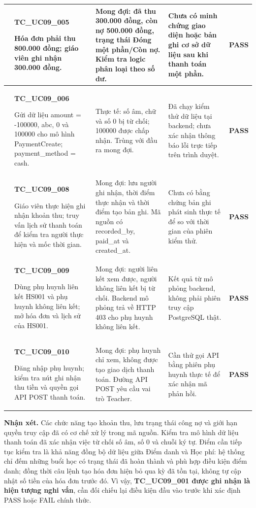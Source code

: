 \begin{longtable}{|>{\centering\arraybackslash}p{0.8cm}|>{\raggedright\arraybackslash}p{4.6cm}|>{\raggedright\arraybackslash}p{3.8cm}|>{\raggedright\arraybackslash}p{3.8cm}|>{\centering\arraybackslash}p{1.5cm}|}
5 & \textbf{TC\_UC09\_005}\par Hóa đơn phải thu 800.000 đồng; giáo viên ghi nhận 300.000 đồng. & Mong đợi: đã thu 300.000 đồng, còn nợ 500.000 đồng, trạng thái Đóng một phần/Còn nợ. Kiểm tra logic phân loại theo số dư. & Chưa có minh chứng giao diện hoặc bản ghi cơ sở dữ liệu sau khi thanh toán một phần. & \textbf{PASS} \\ \hline
6 & \textbf{TC\_UC09\_006}\par Gửi dữ liệu amount = -100000, abc, 0 và 100000 cho mô hình PaymentCreate; payment\_method = cash. & Thực tế: số âm, chữ và số 0 bị từ chối; 100000 được chấp nhận. Trùng với đầu ra mong đợi. & Đã chạy kiểm thử dữ liệu tại backend; chưa xác nhận thông báo lỗi trực tiếp trên trình duyệt. & \textbf{PASS} \\ \hline
7 & \textbf{TC\_UC09\_008}\par Giáo viên thực hiện ghi nhận khoản thu; truy vấn lịch sử thanh toán để kiểm tra người thực hiện và mốc thời gian. & Mong đợi: lưu người ghi nhận, thời điểm thực nhận và thời điểm tạo bản ghi. Mã nguồn có recorded\_by, paid\_at và created\_at. & Chưa có bằng chứng bản ghi phát sinh thực tế để so với thời gian của phiên kiểm thử. & \textbf{PASS} \\ \hline
8 & \textbf{TC\_UC09\_009}\par Dùng phụ huynh liên kết HS001 và phụ huynh không liên kết; mở hóa đơn và lịch sử của HS001. & Mong đợi: người liên kết xem được, người không liên kết bị từ chối. Backend mô phỏng trả về HTTP 403 cho phụ huynh không liên kết. & Kết quả từ mô phỏng backend, không phải phiên truy cập PostgreSQL thật. & \textbf{PASS} \\ \hline
9 & \textbf{TC\_UC09\_010}\par Đăng nhập phụ huynh; kiểm tra nút ghi nhận thu tiền và quyền gọi API POST thanh toán. & Mong đợi: phụ huynh chỉ xem, không được tạo giao dịch thanh toán. Đường API POST yêu cầu vai trò Teacher. & Cần thử gọi API bằng phiên phụ huynh thực tế để xác nhận mã phản hồi. & \textbf{PASS} \\ \hline
\end{longtable}

\noindent\textbf{Nhận xét.} Các chức năng tạo khoản thu, lưu trạng thái công nợ và giới hạn quyền truy cập đã có cơ chế xử lý trong mã nguồn. Kiểm tra mô hình dữ liệu thanh toán đã xác nhận việc từ chối số âm, số 0 và chuỗi ký tự. Điểm cần tiếp tục kiểm tra là khả năng đồng bộ dữ liệu giữa Điểm danh và Học phí: hệ thống chỉ đếm những buổi học có trạng thái đã hoàn thành và phù hợp điều kiện điểm danh; đồng thời câu lệnh tạo hóa đơn hiện bỏ qua kỳ đã tồn tại, không tự cập nhật số tiền của hóa đơn trước đó. Vì vậy, \textbf{TC\_UC09\_001 được ghi nhận là hiện tượng nghi vấn}, cần đối chiếu lại điều kiện đầu vào trước khi xác định PASS hoặc FAIL chính thức.
